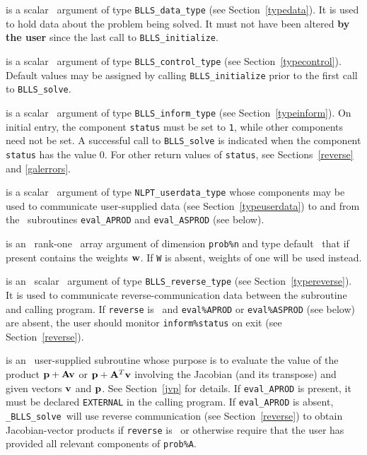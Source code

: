 \documentclass{galahad}
\newcommand{\packagename}{BLLS}
\newcommand{\fullpackagename}{\libraryname\_\packagename}
\newcommand{\solver}{{\tt \fullpackagename\_solve}}
\begin{document}
\begin{description}
 is a scalar \intentinout\ argument of type
{\tt \packagename\_data\_type}
(see Section~\ref{typedata}). It is used to hold data about the problem being
solved. It must not have been altered {\bf by the user} since the last call to
{\tt \packagename\_initialize}.

 is a scalar \intentin\ argument of type
{\tt \packagename\_control\_type}
(see Section~\ref{typecontrol}). Default values may be assigned by calling
{\tt \packagename\_initialize} prior to the first call to
{\tt \packagename\_solve}.

 is a scalar \intentinout\ argument of type
{\tt \packagename\_inform\_type}
(see Section~\ref{typeinform}). On initial entry, the component {\tt status}
must be set to {\tt 1}, while other components need not be set.
A successful call to
{\tt \packagename\_solve}
is indicated when the  component {\tt status} has the value 0.
For other return values of {\tt status}, see Sections~\ref{reverse} and
\ref{galerrors}.

 is a scalar \intentinout\ argument of type
{\tt NLPT\_userdata\_type} whose components may be used
to communicate user-supplied data
(see Section~\ref{typeuserdata})
to and from the \optional\ subroutines
 {\tt eval\_APROD} and {\tt eval\_ASPROD} (see below).

 is an \optional\ rank-one \intentinout\ array argument of dimension
{\tt prob\%n} and type default \realdp\ that if present contains the weights
${\mathbf{w}}$. If {\tt W} is absent, weights of one will be used instead.

 is an \optional\ scalar \intentinout\ argument of type
{\tt \packagename\_reverse\_type}
(see Section~\ref{typereverse}).
It is used to communicate reverse-communication data between the
subroutine and calling program.
If {\tt reverse} is \present\ and {\tt eval\%APROD} or {\tt eval\%ASPROD}
(see below) are absent, the user should monitor {\tt inform\%status} on exit
(see Section~\ref{reverse}).

 is an \optional\
user-supplied subroutine whose purpose is to evaluate the value of the
product ${\mathbf{p}} + {\mathbf{A}} {\mathbf{v}}$ or ${\mathbf{p}} + {\mathbf{A}}^T {\mathbf{v}}$
involving the Jacobian (and its transpose) and given vectors ${\mathbf{v}}$ and ${\mathbf{p}}$.
See Section~\ref{jvp} for details.
If {\tt eval\_APROD} is present,
it must be declared {\tt EXTERNAL} in the calling program.
If {\tt eval\_APROD} is absent, \solver\ will use reverse communication
(see Section~\ref{reverse})
to obtain Jacobian-vector products if {\tt reverse} is \present\ or
otherwise require that the user has provided all relevant
components of {\tt prob\%A}.


\end{description}
\end{document}
